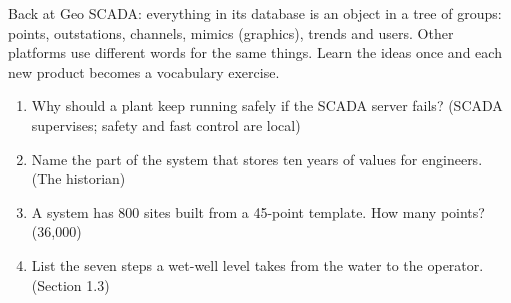 Back at Geo SCADA: everything in its database is an object in a tree of groups: points, outstations, channels, mimics (graphics), trends and users. Other platforms use different words for the same things. Learn the ideas once and each new product becomes a vocabulary exercise.

\begin{enumerate}
\item Why should a plant keep running safely if the SCADA server fails? (SCADA supervises; safety and fast control are local)
\item Name the part of the system that stores ten years of values for engineers. (The historian)
\item A system has 800 sites built from a 45-point template. How many points? (36,000)
\item List the seven steps a wet-well level takes from the water to the operator. (Section 1.3)
\end{enumerate}
